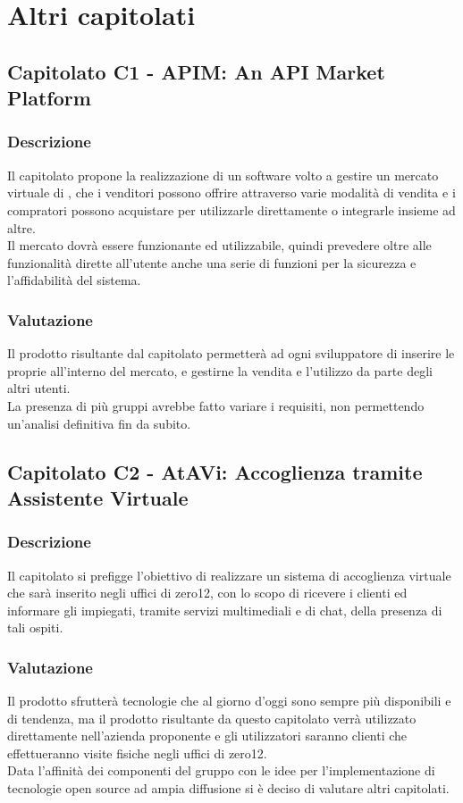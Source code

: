 \section{Altri capitolati}

\subsection{Capitolato C1 - APIM: An API Market Platform}
\subsubsection{Descrizione}
Il capitolato propone la realizzazione di un software volto a gestire un mercato virtuale di , che i venditori possono offrire attraverso varie modalità di vendita e i compratori possono acquistare per utilizzarle direttamente o integrarle insieme ad altre.\\
Il mercato dovrà essere funzionante ed utilizzabile, quindi prevedere oltre alle funzionalità dirette all'utente anche una serie di funzioni per la sicurezza e l'affidabilità del sistema.

\subsubsection{Valutazione}
Il prodotto risultante dal capitolato permetterà ad ogni sviluppatore di inserire le proprie  all'interno del mercato, e gestirne la vendita e l'utilizzo da parte degli altri utenti.\\
La presenza di più gruppi avrebbe fatto variare i requisiti, non permettendo un'analisi definitiva fin da subito.

\subsection{Capitolato C2 - AtAVi: Accoglienza tramite Assistente Virtuale}
\subsubsection{Descrizione}
Il capitolato si prefigge l'obiettivo di realizzare un sistema di accoglienza virtuale che sarà inserito negli uffici di zero12, con lo scopo di ricevere i clienti ed informare gli impiegati, tramite servizi multimediali e di chat, della presenza di tali ospiti.

\subsubsection{Valutazione}
Il prodotto sfrutterà tecnologie che al giorno d'oggi sono sempre più disponibili e di tendenza, ma il prodotto risultante da questo capitolato verrà utilizzato direttamente nell'azienda proponente e gli utilizzatori saranno clienti che effettueranno visite fisiche negli uffici di zero12.\\
Data l'affinità dei componenti del gruppo con le idee per l'implementazione di tecnologie open source ad ampia diffusione si è deciso di valutare altri capitolati.

